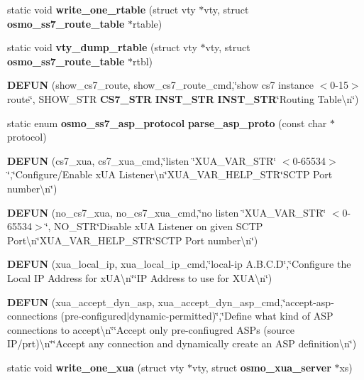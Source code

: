 \begin{DoxyCompactItemize}
\item 
static void {\bf write\+\_\+one\+\_\+rtable} (struct vty $\ast$vty, struct {\bf osmo\+\_\+ss7\+\_\+route\+\_\+table} $\ast$rtable)
\item 
static void {\bf vty\+\_\+dump\+\_\+rtable} (struct vty $\ast$vty, struct {\bf osmo\+\_\+ss7\+\_\+route\+\_\+table} $\ast$rtbl)
\item 
{\bf D\+E\+F\+UN} (show\+\_\+cs7\+\_\+route, show\+\_\+cs7\+\_\+route\+\_\+cmd,\char`\"{}show cs7 instance $<$0-\/15$>$ route\char`\"{}, S\+H\+O\+W\+\_\+\+S\+TR {\bf C\+S7\+\_\+\+S\+TR} {\bf I\+N\+S\+T\+\_\+\+S\+TR} {\bf I\+N\+S\+T\+\_\+\+S\+TR}\char`\"{}Routing Table\textbackslash{}n\char`\"{})
\item 
static enum {\bf osmo\+\_\+ss7\+\_\+asp\+\_\+protocol} {\bf parse\+\_\+asp\+\_\+proto} (const char $\ast$protocol)
\item 
{\bf D\+E\+F\+UN} (cs7\+\_\+xua, cs7\+\_\+xua\+\_\+cmd,\char`\"{}listen \char`\"{}X\+U\+A\+\_\+\+V\+A\+R\+\_\+\+S\+TR\char`\"{} $<$0-\/65534$>$\char`\"{},\char`\"{}Configure/Enable x\+UA Listener\textbackslash{}n\char`\"{}X\+U\+A\+\_\+\+V\+A\+R\+\_\+\+H\+E\+L\+P\+\_\+\+S\+TR\char`\"{}S\+C\+TP Port number\textbackslash{}n\char`\"{})
\item 
{\bf D\+E\+F\+UN} (no\+\_\+cs7\+\_\+xua, no\+\_\+cs7\+\_\+xua\+\_\+cmd,\char`\"{}no listen \char`\"{}X\+U\+A\+\_\+\+V\+A\+R\+\_\+\+S\+TR\char`\"{} $<$0-\/65534$>$\char`\"{}, N\+O\+\_\+\+S\+TR\char`\"{}Disable x\+UA Listener on given S\+C\+TP Port\textbackslash{}n\char`\"{}X\+U\+A\+\_\+\+V\+A\+R\+\_\+\+H\+E\+L\+P\+\_\+\+S\+TR\char`\"{}S\+C\+TP Port number\textbackslash{}n\char`\"{})
\item 
{\bf D\+E\+F\+UN} (xua\+\_\+local\+\_\+ip, xua\+\_\+local\+\_\+ip\+\_\+cmd,\char`\"{}local-\/ip A.\+B.\+C.\+D\char`\"{},\char`\"{}Configure the Local IP Address for x\+U\+A\textbackslash{}n\char`\"{}\char`\"{}IP Address to use for X\+U\+A\textbackslash{}n\char`\"{})
\item 
{\bf D\+E\+F\+UN} (xua\+\_\+accept\+\_\+dyn\+\_\+asp, xua\+\_\+accept\+\_\+dyn\+\_\+asp\+\_\+cmd,\char`\"{}accept-\/asp-\/connections (pre-\/configured$\vert$dynamic-\/permitted)\char`\"{},\char`\"{}Define what kind of A\+SP connections to accept\textbackslash{}n\char`\"{}\char`\"{}Accept only pre-\/confiugred A\+S\+Ps (source IP/prt)\textbackslash{}n\char`\"{}\char`\"{}Accept any connection and dynamically create an A\+SP definition\textbackslash{}n\char`\"{})
\item 
static void {\bf write\+\_\+one\+\_\+xua} (struct vty $\ast$vty, struct {\bf osmo\+\_\+xua\+\_\+server} $\ast$xs)

\end{DoxyCompactItemize}
